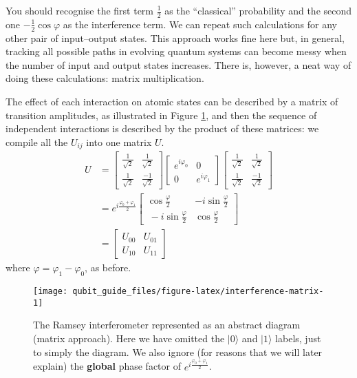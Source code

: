 \documentclass[fleqn]{article}
\begin{document}
You should recognise the first term \(\frac{1}{2}\) as the ``classical'' probability and the second one \(-\frac{1}{2}\cos\varphi\) as the interference term.
We can repeat such calculations for any other pair of input--output states.
This approach works fine here but, in general, tracking all possible paths in evolving quantum systems can become messy when the number of input and output states increases.
There is, however, a neat way of doing these calculations: matrix multiplication.

The effect of each interaction on atomic states can be described by a matrix of transition amplitudes, as illustrated in Figure \ref{fig:interference-matrix}, and then the sequence of independent interactions is described by the product of these matrices: we compile all the \(U_{ij}\) into one matrix \(U\).
\[
  \begin{aligned}
    U &=
    \begin{bmatrix}
      \frac{1}{\sqrt{2}} & \frac{1}{\sqrt{2}}
    \\\frac{1}{\sqrt{2}} & \frac{-1}{\sqrt{2}}
    \end{bmatrix}
    \begin{bmatrix}
      e^{i\varphi_0} & 0
    \\0 & e^{i\varphi_1}
    \end{bmatrix}
    \begin{bmatrix}
      \frac{1}{\sqrt{2}} & \frac{1}{\sqrt{2}}
    \\\frac{1}{\sqrt{2}} & \frac{-1}{\sqrt{2}}
    \end{bmatrix}
  \\&= e^{i\frac{\varphi_0+\varphi_1}{2}}
    \begin{bmatrix}
      \cos\frac{\varphi}{2} & -i\sin\frac{\varphi}{2}
    \\\ -i\sin\frac{\varphi}{2}& \cos\frac{\varphi}{2}
    \end{bmatrix}
  \\&=
    \begin{bmatrix}
      U_{00} & U_{01}
    \\U_{10} & U_{11}
    \end{bmatrix}
  \end{aligned}
\]
where \(\varphi = \varphi_1-\varphi_0\), as before.



\begin{figure}[H]

{\centering \texttt{[image: qubit\_guide\_files/figure-latex/interference-matrix-1]} 

}

\caption{The Ramsey interferometer represented as an abstract diagram (matrix approach). Here we have omitted the \(|0\rangle\) and \(|1\rangle\) labels, just to simply the diagram. We also ignore (for reasons that we will later explain) the \textbf{global} phase factor of \(e^{i\frac{\varphi_0+\varphi_1}{2}}\).}\label{fig:interference-matrix}
\end{figure}
\end{document}
